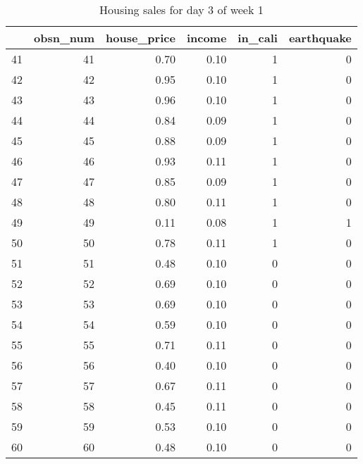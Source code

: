 \begin{table}[ht]
\centering
\begin{tabular}{rrrrrr}
  \hline
 & obsn\_num & house\_price & income & in\_cali & earthquake \\ 
  \hline
41 &  41 & 0.70 & 0.10 &   1 &   0 \\ 
  42 &  42 & 0.95 & 0.10 &   1 &   0 \\ 
  43 &  43 & 0.96 & 0.10 &   1 &   0 \\ 
  44 &  44 & 0.84 & 0.09 &   1 &   0 \\ 
  45 &  45 & 0.88 & 0.09 &   1 &   0 \\ 
  46 &  46 & 0.93 & 0.11 &   1 &   0 \\ 
  47 &  47 & 0.85 & 0.09 &   1 &   0 \\ 
  48 &  48 & 0.80 & 0.11 &   1 &   0 \\ 
  49 &  49 & 0.11 & 0.08 &   1 &   1 \\ 
  50 &  50 & 0.78 & 0.11 &   1 &   0 \\ 
  51 &  51 & 0.48 & 0.10 &   0 &   0 \\ 
  52 &  52 & 0.69 & 0.10 &   0 &   0 \\ 
  53 &  53 & 0.69 & 0.10 &   0 &   0 \\ 
  54 &  54 & 0.59 & 0.10 &   0 &   0 \\ 
  55 &  55 & 0.71 & 0.11 &   0 &   0 \\ 
  56 &  56 & 0.40 & 0.10 &   0 &   0 \\ 
  57 &  57 & 0.67 & 0.11 &   0 &   0 \\ 
  58 &  58 & 0.45 & 0.11 &   0 &   0 \\ 
  59 &  59 & 0.53 & 0.10 &   0 &   0 \\ 
  60 &  60 & 0.48 & 0.10 &   0 &   0 \\ 
   \hline
\end{tabular}
\caption{Housing sales for day 3 of week 1} 
\end{table}
